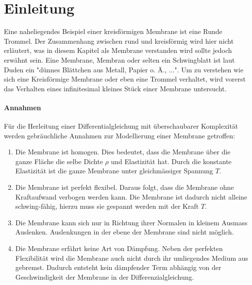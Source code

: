 %
%
%
\section{Einleitung\label{kreismembran:section:teil0}}
Eine naheliegendes Beispiel einer kreisförmigen Membrane ist eine Runde Trommel. 
Der Zusammenhang zwischen rund und kreisförmig wird hier nicht erläutert, was in diesem Kapitel als Membrane verstanden wird sollte jedoch erwähnt sein. 
Eine Membrane, Membran oder selten ein Schwingblatt ist laut Duden \cite{kreismembran:Duden:Membrane} ein "dünnes Blättchen aus Metall, Papier o. Ä., ...". 
Um zu verstehen wie sich eine Kreisförmige Membrane oder eben eine Trommel verhaltet, wird vorerst das Verhalten eines infinitesimal kleines Stück einer Membrane untersucht.     

\paragraph{Annahmen} Für die Herleitung einer Differentialgleichung mit überschaubarer Komplexität werden gebräuchliche Annahmen zur Modellierung einer Membrane \cite{kreismembran:wellengleichung_herleitung} getroffen: 
\begin{enumerate}[i]
	\item Die Membrane ist homogen. 
	Dies bedeutet, dass die Membrane über die ganze Fläche die selbe Dichte $ \rho $  und Elastizität hat. 
	Durch die konstante Elastizität ist die ganze Membrane unter gleichmässiger Spannung $ T $.
	\item Die Membrane ist perfekt flexibel. 
	Daraus folgt, dass die Membrane ohne Kraftaufwand verbogen werden kann. 
	Die Membrane ist dadurch nicht alleine schwing-fähig, hierzu muss sie gespannt werden mit der Kraft $ T $.
	\item Die Membrane kann sich nur in Richtung ihrer Normalen in kleinem Ausmass Auslenken.
	Auslenkungen in der ebene der Membrane sind nicht möglich.
	\item Die Membrane erfährt keine Art von Dämpfung. 
	Neben der perfekten Flexibilität wird die Membrane auch nicht durch ihr umliegendes Medium aus gebremst.
	Dadurch entsteht kein dämpfender Term abhängig von der Geschwindigkeit der Membrane in der Differenzialgleichung. 
\end{enumerate}

